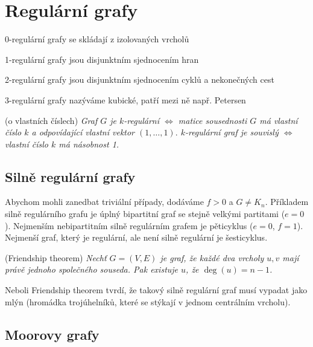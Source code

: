 \section{Regulární grafy}

\begin{itemize*}
\item 0-regulární grafy se skládají z izolovaných vrcholů
\item 1-regulární grafy jsou disjunktním sjednocením hran
\item 2-regulární grafy jsou disjunktním sjednocením cyklů a nekonečných cest
\item 3-regulární grafy nazýváme kubické, patří mezi ně např. Petersen
\end{itemize*}

\vt (o vlastních číslech) {\it Graf $G$ je $k$-regulární $\Leftrightarrow$ matice sousednosti $G$ má vlastní číslo $k$ a odpovídající vlastní vektor $(1,\dots,1).$ 
$k$-regulární graf je souvislý $\Leftrightarrow$ vlastní číslo $k$ má násobnost 1.}

\subsection{Silně regulární grafy}

Abychom mohli zanedbat triviální případy, dodáváme $f>0$ a $G\neq K_n$.
Příkladem silně regulárního grafu je úplný bipartitní graf se stejně velkými
partitami ($e=0$). Nejmenším nebipartitním silně regulárním grafem je
pěticyklus ($e=0$, $f=1$). Nejmenší graf, který je regulární, ale není silně
regulární je šesticyklus.

\vt (Friendship theorem) {\it Nechť $G=(V,E)$ je graf, že každé dva vrcholy $u,v$ mají právě jednoho společného souseda. Pak existuje $u$, že $\deg(u) = n-1$.}

Neboli Friendship theorem tvrdí, že takový silně regulární graf musí vypadat jako
mlýn (hromádka trojúhelníků, které se stýkají v jednom centrálním vrcholu).

\subsection{Moorovy grafy}

